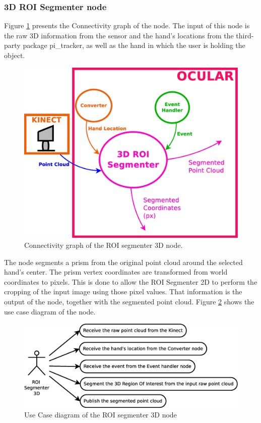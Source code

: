 	

\subsubsection{3D ROI Segmenter node}
	\label{roi_segmenter_3d}

	Figure  \ref{node_roi3d} presents the Connectivity graph of the node. 
	The input of this node is the raw 3D information from the sensor and the hand's locations from the third-party package pi\_tracker, as well as the hand in which the user is holding the object. 

		\begin{figure}[H]
			\begin{center}
			\includegraphics[width=0.5\linewidth]{img/diagrams/node_roi3d.eps}
			\caption[ROI segmenter 3D node I/O]{Connectivity graph of the ROI segmenter 3D node.}		
			\label{node_roi3d}
			\end{center}
		\end{figure}


	The node segments a prism from the original point cloud around the selected hand's center. 
	The prism vertex coordinates are transformed from world coordinates to pixels. 
	This is done to allow the ROI Segmenter 2D to perform the cropping of the input image using those pixel values. 
	That information is the output of the node, together with the segmented point cloud. 
	Figure \ref{uc_roi3d} shows the use case diagram of the node. 

	\begin{figure}[H]
		\centering
	\includegraphics[scale=0.4]{img/diagrams/uc_roi_segmenter_3d.eps}
		\caption[Use case diagram ROI segmenter 3D node]{Use Case diagram of the ROI segmenter 3D node}
		\label{uc_roi3d}	
	\end{figure}
 
